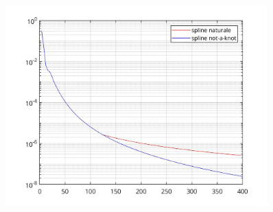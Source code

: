 \documentclass[10pt,a4paper]{article}
\begin{document}
\section{}
\begin{figure}[h!]
  \centering
  \includegraphics[width=0.9\textwidth]{../figure/esercizio_23}  
\end{figure}
\end{document}
